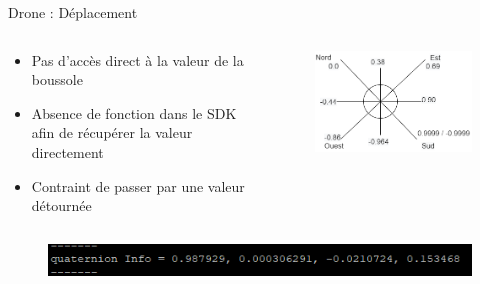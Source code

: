 \begin{frame}[allowframebreaks]{Drone : Déplacement}
        		
        		\begin{columns}
                    \begin{column}{0.5\textwidth}
                        \begin{block}{}
                            \begin{itemize}
                                [square]
                                \item Pas d'accès direct à la valeur de la boussole
                                \item Absence de fonction dans le SDK afin de récupérer la valeur directement
                                \item Contraint de passer par une valeur détournée
                            \end{itemize}
                        \end{block}
                    \end{column}\hfill
                    \begin{column}{0.5\textwidth}
                        \begin{figure}[H]
                            \centering
                            \includegraphics[width=1\linewidth]{images/roseVents.png}
                        \end{figure}
                    \end{column}
                \end{columns}
                
                \begin{figure}[H]
                    \centering
                    \includegraphics[width=1\linewidth]{images/quat.png}
                \end{figure}
            \end{frame}
